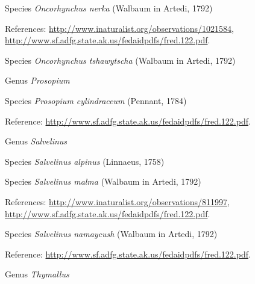 \documentclass[9pt, article]{memoir}
\begin{document}
\begin{multicols}{2}
\vspace{6pt}\noindent\hspace{36pt}Species \textit{Oncorhynchus nerka} (Walbaum in Artedi, 1792)


\vspace{6pt}References: 
\url{http://www.inaturalist.org/observations/1021584}, 
\url{http://www.sf.adfg.state.ak.us/fedaidpdfs/fred.122.pdf}.

\vspace{6pt}\noindent\hspace{36pt}Species \textit{Oncorhynchus tshawytscha} (Walbaum in Artedi, 1792)


\vspace{6pt}\noindent\hspace{30pt}Genus \textit{Prosopium}


\vspace{6pt}\noindent\hspace{36pt}Species \textit{Prosopium cylindraceum} (Pennant, 1784)


\vspace{6pt}Reference: 
\url{http://www.sf.adfg.state.ak.us/fedaidpdfs/fred.122.pdf}.

\vspace{6pt}\noindent\hspace{30pt}Genus \textit{Salvelinus}


\vspace{6pt}\noindent\hspace{36pt}Species \textit{Salvelinus alpinus} (Linnaeus, 1758)


\vspace{6pt}\noindent\hspace{36pt}Species \textit{Salvelinus malma} (Walbaum in Artedi, 1792)


\vspace{6pt}References: 
\url{http://www.inaturalist.org/observations/811997}, 
\url{http://www.sf.adfg.state.ak.us/fedaidpdfs/fred.122.pdf}.

\vspace{6pt}\noindent\hspace{36pt}Species \textit{Salvelinus namaycush} (Walbaum in Artedi, 1792)


\vspace{6pt}Reference: 
\url{http://www.sf.adfg.state.ak.us/fedaidpdfs/fred.122.pdf}.

\vspace{6pt}\noindent\hspace{30pt}Genus \textit{Thymallus}



\end{multicols}
\end{document}
